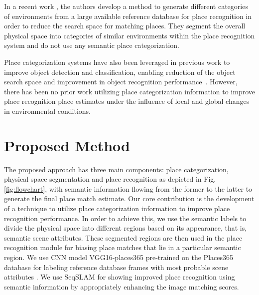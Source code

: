 \documentclass[letterpaper, 10 pt, conference]{ieeeconf}  %
\begin{document}
In a recent work \cite{mohan2015environment}, the authors develop a method to generate different categories of environments from a large available reference database for place recognition in order to reduce the search space for matching places. They segment the overall physical space into categories of similar environments within the place recognition system and do not use any semantic place categorization.

Place categorization systems have also been leveraged in previous work to improve object detection and classification, enabling reduction of the object search space and improvement in object recognition performance~\cite{torralba2003context}. However, there has been no prior work utilizing place categorization information to improve place recognition place estimates under the influence of local and global changes in environmental conditions. 



\section{Proposed Method}
The proposed approach has three main components: place categorization, physical space segmentation and place recognition as depicted in Fig. \ref{fig:flowchart}, with semantic information flowing from the former to the latter to generate the final place match estimate. Our core contribution is the development of a technique to utilize place categorization information to improve place recognition performance. In order to achieve this, we use the semantic labels to divide the physical space into different regions based on its appearance, that is, semantic scene attributes. These segmented regions are then used in the place recognition module for biasing place matches that lie in a particular semantic region. We use CNN model VGG16-places365 \cite{cnnPlaces365Github} pre-trained on the Places365 database \cite{zhou2014learning} for labeling reference database frames with most probable scene attributes \cite{Patterson2012SunAttributes}. We use SeqSLAM \cite{Milford2012} for showing improved place recognition using semantic information by appropriately enhancing the image matching scores.
\end{document}
